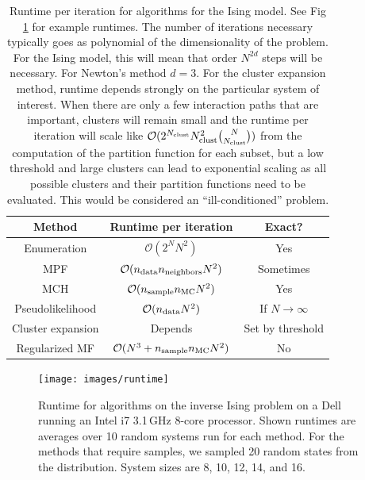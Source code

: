 \documentclass[aps,prl,twocolumn]{revtex4-1}
\begin{document}
%

\begin{table}[bt]
\begin{center}
\begin{tabular}{|c|c|c|}
\hline
	Method 	& Runtime per iteration & Exact? \\
\hline
	Enumeration 		& $\mathcal{O}(2^N N^2)$ & Yes\\
	MPF					& $\mathcal{O}(n_{\rm data}n_{\rm neighbors}N^2)$ & Sometimes\\
	MCH 				& $\mathcal{O}(n_{\rm sample}n_{\rm MC}N^2)$ & Yes\\
	Pseudolikelihood 	& $\mathcal{O}(n_{\rm data}N^2)$ & If $N\rightarrow\infty$\\
	Cluster expansion 	& Depends & Set by threshold\\
	Regularized MF & $\mathcal{O}(N^3 + n_{\rm sample}n_{\rm MC}N^2)$ & No\\
\hline
\end{tabular}
\caption{Runtime per iteration for algorithms for the Ising model. See Fig \ref{gr:runtime} for example runtimes. 
The number of iterations necessary typically goes as polynomial of the dimensionality of the problem. For the Ising model, this will mean that order $N^{2d}$ steps will be necessary. For Newton's method $d=3$.
For the cluster expansion method, runtime depends strongly on the particular system of interest. When there are only a few interaction paths that are important, clusters will remain small and the runtime per iteration will scale like $\mathcal{O}(2^{N_{\rm clust}}N_{\rm clust}^2\binom{N}{N_{\rm clust}})$ from the computation of the partition function for each subset, but a low threshold and large clusters can lead to exponential scaling as all possible clusters and their partition functions need to be evaluated. This would be considered an ``ill-conditioned'' problem.}\label{tb:runtime}
\end{center}
\end{table}%

\begin{figure}[tb]\centering
	\texttt{[image: images/runtime]}
\caption{Runtime for algorithms on the inverse Ising problem on a Dell running an Intel i7 3.1\,GHz 8-core processor. Shown runtimes are averages over 10 random systems run for each method. For the methods that require samples, we sampled 20 random states from the distribution. System sizes are 8, 10, 12, 14, and 16.}
\label{gr:runtime}
\end{figure}
\end{document}
